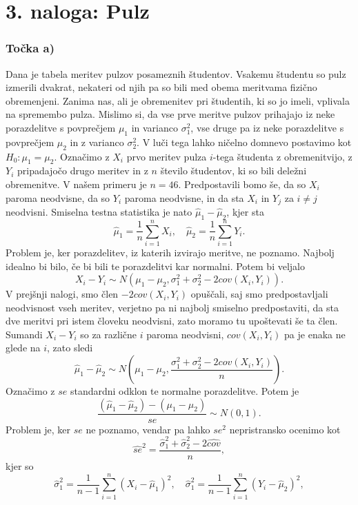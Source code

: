 \documentclass[12pt, letterpaper]{article}
\begin{document}
\section*{3. naloga: Pulz}

\subsubsection*{Točka a)} Dana je tabela meritev pulzov posameznih študentov. Vsakemu študentu so pulz izmerili dvakrat, nekateri od njih pa so bili med obema meritvama fizično obremenjeni. Zanima nas, ali je obremenitev pri študentih, ki so jo imeli, vplivala na spremembo pulza. Mislimo si, da vse prve meritve pulzov prihajajo iz neke porazdelitve s povprečjem $\mu_1$ in varianco $\sigma_1^2$, vse druge pa iz neke porazdelitve s povprečjem $\mu_2$ in z varianco $\sigma_2^2$. V luči tega lahko ničelno domnevo postavimo kot $H_0 : \mu_1 = \mu_2$. Označimo z $X_i$ prvo meritev pulza $i$-tega študenta z obremenitvijo, z $Y_i$ pripadajočo drugo meritev in z $n$ število študentov, ki so bili deležni obremenitve. V našem primeru je $n = 46$. Predpostavili bomo še, da so $X_i$ paroma neodvisne, da so $Y_i$ paroma neodvisne, in da sta $X_i$ in $Y_j$ za $i \neq j$ neodvisni. Smiselna testna statistika je nato $\hat{\mu}_1 - \hat{\mu}_2$, kjer sta
\[
\hat{\mu}_1 = \frac{1}{n}\sum_{i=1}^nX_i, \quad
\hat{\mu}_2 = \frac{1}{n}\sum_{i=1}^nY_i.
\]
Problem je, ker porazdelitev, iz katerih izvirajo meritve, ne poznamo. Najbolj idealno bi bilo, če bi bili te porazdelitvi kar normalni. Potem bi veljalo
\[
X_i - Y_i \sim N(\mu_1 - \mu_2, \sigma_1^2 + \sigma_2^2 - 2cov(X_i,Y_i)).
\]
V prejšnji nalogi, smo člen $-2cov(X_i,Y_i)$ opuščali, saj smo predpostavljali neodvisnost vseh meritev, verjetno pa ni najbolj smiselno predpostaviti, da sta dve meritvi pri istem človeku neodvisni, zato moramo tu upoštevati še ta člen. Sumandi $X_i - Y_i$ so za različne $i$ paroma neodvisni, $cov(X_i,Y_i)$ pa je enaka ne glede na $i$, zato sledi
\[
\hat{\mu}_1 - \hat{\mu}_2 \sim N\left(\mu_1 - \mu_2, \frac{\sigma_1^2 + \sigma_2^2 - 2cov(X_i,Y_i)}{n}\right).
\]
Označimo z $se$ standardni odklon te normalne porazdelitve. Potem je
\[
\frac{(\hat{\mu}_1 - \hat{\mu}_2) - (\mu_1 - \mu_2)}{se} \sim N(0,1).
\]
Problem je, ker $se$ ne poznamo, vendar pa lahko $se^2$ nepristransko ocenimo kot
\[
\hat{se}^2 = \frac{\hat{\sigma}_1^2 + \hat{\sigma}_2^2 - 2\widehat{cov}}{n},
\]
kjer so
\[
\hat{\sigma}_1^2 = \frac{1}{n-1}\sum_{i=1}^n(X_i - \hat{\mu}_1)^2, \quad
\hat{\sigma}_1^2 = \frac{1}{n-1}\sum_{i=1}^n(Y_i - \hat{\mu}_2)^2,
\]
\end{document}
